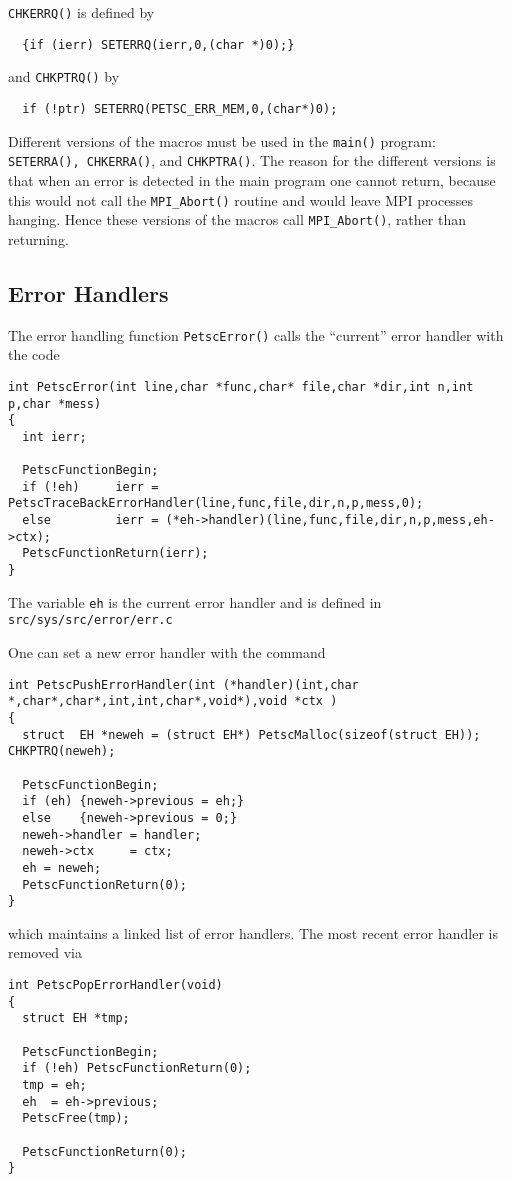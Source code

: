 {\tt CHKERRQ()} is defined by
\begin{verbatim}
  {if (ierr) SETERRQ(ierr,0,(char *)0);}
\end{verbatim}
and {\tt CHKPTRQ()} by 
\begin{verbatim}
  if (!ptr) SETERRQ(PETSC_ERR_MEM,0,(char*)0);
\end{verbatim}

Different versions of the macros must be used in the {\tt main()} program:
{\tt SETERRA(), CHKERRA()}, and {\tt CHKPTRA()}. The reason for the different versions
is that when an error is detected in the main program one cannot return, because 
this would not call the {\tt MPI\_Abort()} routine and would leave MPI processes hanging.
Hence these versions of the macros call {\tt MPI\_Abort()}, rather than returning.

\subsection{Error Handlers}
The error handling function {\tt PetscError()} calls the ``current'' error handler
with the code
\begin{verbatim}
int PetscError(int line,char *func,char* file,char *dir,int n,int p,char *mess)
{
  int ierr;

  PetscFunctionBegin;
  if (!eh)     ierr = PetscTraceBackErrorHandler(line,func,file,dir,n,p,mess,0);
  else         ierr = (*eh->handler)(line,func,file,dir,n,p,mess,eh->ctx);
  PetscFunctionReturn(ierr);
}
\end{verbatim}
The variable {\tt eh} is the current error handler and is defined in 
{\tt src/sys/src/error/err.c}

One can set a new error handler with the command 
\begin{verbatim}
int PetscPushErrorHandler(int (*handler)(int,char *,char*,char*,int,int,char*,void*),void *ctx )
{
  struct  EH *neweh = (struct EH*) PetscMalloc(sizeof(struct EH)); CHKPTRQ(neweh);

  PetscFunctionBegin;
  if (eh) {neweh->previous = eh;} 
  else    {neweh->previous = 0;}
  neweh->handler = handler;
  neweh->ctx     = ctx;
  eh = neweh;
  PetscFunctionReturn(0);
}
\end{verbatim}
which maintains a linked list of error handlers. The most recent error handler is removed
via
\begin{verbatim}
int PetscPopErrorHandler(void)
{
  struct EH *tmp;

  PetscFunctionBegin;
  if (!eh) PetscFunctionReturn(0);
  tmp = eh;
  eh  = eh->previous;
  PetscFree(tmp);

  PetscFunctionReturn(0);
}
\end{verbatim}

